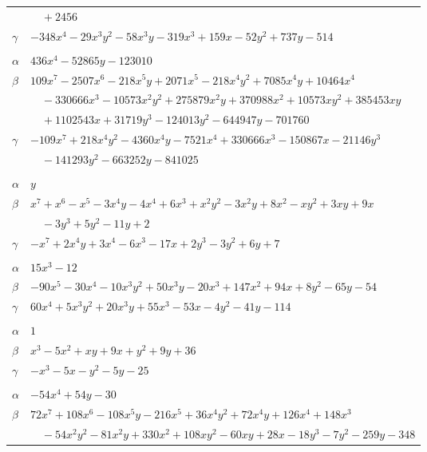 \documentclass[11pt]{article}
\begin{document}
\begin{longtable}{@{}ll@{}}
 & $\quad +2456$\\
$\gamma$ & $-348x^{4}-29x^{3}y^{2}-58x^{3}y-319x^{3}+159x-52y^{2}+737y-514$\\
\addlinespace[3pt]
\multicolumn{2}{@{}l}{$\{i,j\}=\{50,64\}$, $k_{ij}=2^{7}\cdot 3^{5}\cdot 5$}\\
$\alpha$ & $436x^{4}-52865y-123010$\\
$\beta$ & $109x^{7}-2507x^{6}-218x^{5}y+2071x^{5}-218x^{4}y^{2}+7085x^{4}y+10464x^{4}$\\
 & $\quad -330666x^{3}-10573x^{2}y^{2}+275879x^{2}y+370988x^{2}+10573xy^{2}+385453xy$\\
 & $\quad +1102543x+31719y^{3}-124013y^{2}-644947y-701760$\\
$\gamma$ & $-109x^{7}+218x^{4}y^{2}-4360x^{4}y-7521x^{4}+330666x^{3}-150867x-21146y^{3}$\\
 & $\quad -141293y^{2}-663252y-841025$\\
\addlinespace[3pt]
\multicolumn{2}{@{}l}{$\{i,j\}=\{50,70\}$, $k_{ij}=2\cdot 3^{2}$}\\
$\alpha$ & $y$\\
$\beta$ & $x^{7}+x^{6}-x^{5}-3x^{4}y-4x^{4}+6x^{3}+x^{2}y^{2}-3x^{2}y+8x^{2}-xy^{2}+3xy+9x$\\
 & $\quad -3y^{3}+5y^{2}-11y+2$\\
$\gamma$ & $-x^{7}+2x^{4}y+3x^{4}-6x^{3}-17x+2y^{3}-3y^{2}+6y+7$\\
\addlinespace[3pt]
\multicolumn{2}{@{}l}{$\{i,j\}=\{50,76\}$, $k_{ij}=2^{2}\cdot 3^{3}$}\\
$\alpha$ & $15x^{3}-12$\\
$\beta$ & $-90x^{5}-30x^{4}-10x^{3}y^{2}+50x^{3}y-20x^{3}+147x^{2}+94x+8y^{2}-65y-54$\\
$\gamma$ & $60x^{4}+5x^{3}y^{2}+20x^{3}y+55x^{3}-53x-4y^{2}-41y-114$\\
\addlinespace[3pt]
\multicolumn{2}{@{}l}{$\{i,j\}=\{50,106\}$, $k_{ij}=2^{4}\cdot 3$}\\
$\alpha$ & $1$\\
$\beta$ & $x^{3}-5x^{2}+xy+9x+y^{2}+9y+36$\\
$\gamma$ & $-x^{3}-5x-y^{2}-5y-25$\\
\addlinespace[3pt]
\multicolumn{2}{@{}l}{$\{i,j\}=\{51,78\}$, $k_{ij}=2^{7}\cdot 3$}\\
$\alpha$ & $-54x^{4}+54y-30$\\
$\beta$ & $72x^{7}+108x^{6}-108x^{5}y-216x^{5}+36x^{4}y^{2}+72x^{4}y+126x^{4}+148x^{3}$\\
 & $\quad -54x^{2}y^{2}-81x^{2}y+330x^{2}+108xy^{2}-60xy+28x-18y^{3}-7y^{2}-259y-348$\\

\end{longtable}
\end{document}

